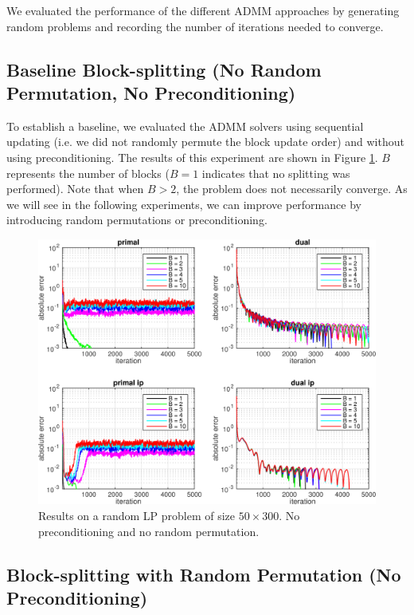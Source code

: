 \documentclass{article}
\begin{document}
We evaluated the performance of the different ADMM approaches by generating random problems and recording the number of iterations needed to converge.

\subsection*{Baseline Block-splitting (No Random Permutation, No Preconditioning)}
To establish a baseline, we evaluated the ADMM solvers using sequential updating (i.e. we did not randomly permute the block update order) and without using preconditioning. The results of this experiment are shown in Figure \ref{fig:nop_nor}. $B$ represents the number of blocks ($B=1$ indicates that no splitting was performed). Note that when $B>2$, the problem does not necessarily converge. As we will see in the following experiments, we can improve performance by introducing random permutations or preconditioning.

\begin{figure}[h]
	\includegraphics[width=\textwidth]{../figures/noprecond_norndperm.png}
	\caption{Results on a random LP problem of size $50 \times 300$. No preconditioning and no random permutation.}
	\label{fig:nop_nor}
\end{figure}

\subsection*{Block-splitting with Random Permutation (No Preconditioning)}
\end{document}
